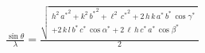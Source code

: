 


\begin{eqnarray*}
  \frac{\sin \theta}{\lambda} = \frac{\sqrt{
\begin{array}{c}
	h^2\,{a^\ast}^2+k^2\,{b^\ast}^2+\ell^2\,{c^\ast}^2 + 
	2\,h\,k\,a^\ast\,b^\ast\,\cos \gamma^\ast \\
	+ 2\,k\,l\,b^\ast\,c^\ast\,\cos \alpha^\ast + 
	2\,\ell\,h\,c^\ast\,a^\ast\,\cos \beta^\ast\\
\end{array}
}}{2}
\end{eqnarray*}

